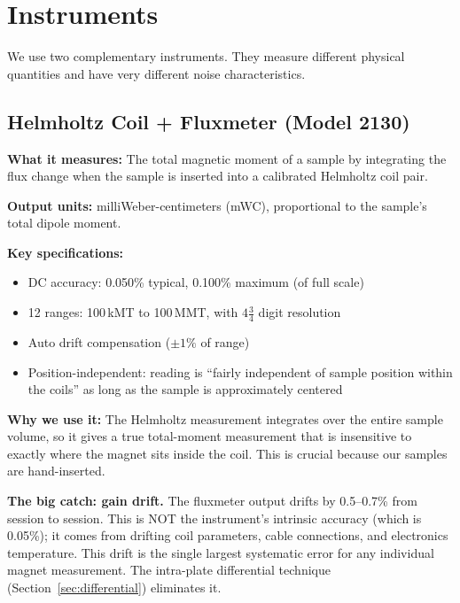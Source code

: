 \documentclass[11pt,letterpaper]{article}
\begin{document}
\section{Instruments}
\label{sec:instruments}

We use two complementary instruments. They measure different physical quantities
and have very different noise characteristics.

\subsection{Helmholtz Coil + Fluxmeter (Model 2130)}
\label{sec:helmholtz}

\textbf{What it measures:} The total magnetic moment of a sample by integrating
the flux change when the sample is inserted into a calibrated Helmholtz coil
pair.

\textbf{Output units:} milliWeber-centimeters (mWC), proportional to the
sample's total dipole moment.

\textbf{Key specifications:}
\begin{itemize}[nosep]
  \item DC accuracy: 0.050\% typical, 0.100\% maximum (of full scale)
  \item 12 ranges: \num{100}\,kMT to \num{100}\,MMT, with $4\tfrac{3}{4}$ digit resolution
  \item Auto drift compensation ($\pm 1\%$ of range)
  \item Position-independent: reading is ``fairly independent of sample position
    within the coils'' as long as the sample is approximately centered
\end{itemize}

\textbf{Why we use it:} The Helmholtz measurement integrates over the entire
sample volume, so it gives a true total-moment measurement that is insensitive
to exactly where the magnet sits inside the coil. This is crucial because our
samples are hand-inserted.

\textbf{The big catch: gain drift.} The fluxmeter output drifts by
0.5--0.7\% from session to session. This is NOT the instrument's intrinsic
accuracy (which is 0.05\%); it comes from drifting coil parameters, cable
connections, and electronics temperature. This drift is the single largest
systematic error for any individual magnet measurement. The intra-plate
differential technique (Section~\ref{sec:differential}) eliminates it.
\end{document}
